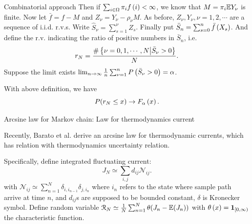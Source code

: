 \documentclass{beamer}
\begin{document}
\begin{frame}{Combinatorial approach}
Then if $\sum_{i \in \Omega} \pi_i f\left( i \right) < \infty$, we know that $M = \pi_i \mathbb{E} Y_{\nu}$ is finite. Now let $\bar{f} = f - M$ and $Z_{\nu} = Y_{\nu} - \rho_{\nu}M$. As before, $Z_{\nu}, Y_{\nu}, \nu = 1,2,\cdots$ are a sequence of i.i.d. r.v.s. Write $\hat{S}_{\nu} = \sum_{s = 1}^{\nu} Z_s$. Finally put $\bar{S}_n = \sum_{s = 0}^n \bar{f}\left( X_s \right)$. And define the r.v. indicating the ratio of positive numbers in $\bar{S}_n$, i.e.
\begin{equation}
    r_N  = \frac{\# \left\{ \nu = 0,1, \cdots, N \big| \bar{S}_{\nu} > 0 \right\}}{N}.
\end{equation}
Suppose the limit exists $\lim_{n \rightarrow \infty} \frac{1}{n} \sum_{\nu = 1}^n P\left( \bar{S}_{\nu} > 0 \right) = \alpha$.
\begin{Thm}
    With above definition, we have
    \begin{equation}
P(r_N \leq x) \rightarrow  F_{\alpha}\left( x \right).
\end{equation}
\end{Thm}
\end{frame}


\begin{frame}{Arcsine law for Markov chain: Law for thermodynamics current}
\par
Recently, Barato et al. derive an arcsine law for thermodynamic currents, which has relation with thermodynamics uncertainty relation.
\par
Specifically, define integrated fluctuating current:
\begin{equation}
    J_N \simeq \sum_{i,j}d_{ij}\mathcal{N}_{ij}.
\end{equation}
with $\mathcal{N}_{ij}\simeq \sum_{n=1}^N \delta_{i,i_{n-1}}\delta_{j,i_n}$ where $i_n$ refers to the state where sample path arrive at time $n$, and $d_{ij}$s are supposed to be bounded constant, $\delta$ is Kronecker symbol. Define random variable $\mathcal{R}_N \simeq \frac{1}{N}\sum_{n=1}^N \theta(J_n-\mathbb{E}(J_n))$ with $\theta\left( x \right) = \mathbf{1}_{\left[ 0, \infty \right)}$ the characteristic function.

\end{frame}
\end{document}
